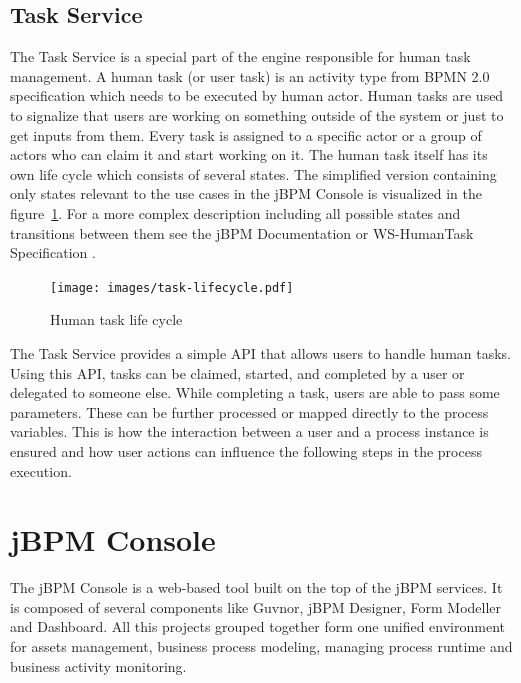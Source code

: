 \documentclass[12pt,oneside,final]{fithesis2}
\begin{document}
\subsection{Task Service}
The Task Service is a special part of the engine responsible for human task management.
A human task (or user task) is an activity type from BPMN 2.0 specification which needs to be executed by human actor.
Human tasks are used to signalize that users are working on something outside of the system or just to get inputs from them.
Every task is assigned to a specific actor or a group of actors who can claim it and start working on it.
The human task itself has its own life cycle which consists of several states.
The simplified version containing only states relevant to the use cases in the jBPM Console is visualized in the figure~\ref{fig:task-lifecycle}.
For a more complex description including all possible states and transitions between them see the jBPM Documentation or WS-HumanTask Specification \cite{jbpm6tasklife,ws-humantask}.

\begin{figure}[ht!]
\centering
\texttt{[image: images/task-lifecycle.pdf]}
\caption{Human task life cycle}
\label{fig:task-lifecycle}
\end{figure}

The Task Service provides a simple API that allows users to handle human tasks.
Using this API, tasks can be claimed, started, and completed by a user or delegated to someone else.
While completing a task, users are able to pass some parameters.
These can be further processed or mapped directly to the process variables.
This is how the interaction between a user and a process instance is ensured and how user actions can influence the following steps in the process execution.

\section{jBPM Console}
The jBPM Console is a web-based tool built on the top of the jBPM services.
It is composed of several components like Guvnor, jBPM Designer, Form Modeller and Dashboard.
All this projects grouped together form one unified environment for assets management, business process modeling, managing process runtime and business activity monitoring.
\end{document}

